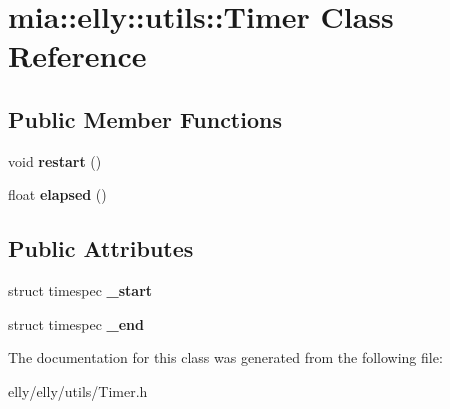 \hypertarget{classmia_1_1elly_1_1utils_1_1_timer}{\section{mia\-:\-:elly\-:\-:utils\-:\-:Timer Class Reference}
\label{classmia_1_1elly_1_1utils_1_1_timer}
}
\subsection*{Public Member Functions}
\begin{DoxyCompactItemize}
\item 
\hypertarget{classmia_1_1elly_1_1utils_1_1_timer_ab1d1c1ad1f3a3931f9e83917494d4417}{void {\bfseries restart} ()}\label{classmia_1_1elly_1_1utils_1_1_timer_ab1d1c1ad1f3a3931f9e83917494d4417}

\item 
\hypertarget{classmia_1_1elly_1_1utils_1_1_timer_adbdb379b3e084eb86b88e5edaaefc27c}{float {\bfseries elapsed} ()}\label{classmia_1_1elly_1_1utils_1_1_timer_adbdb379b3e084eb86b88e5edaaefc27c}

\end{DoxyCompactItemize}
\subsection*{Public Attributes}
\begin{DoxyCompactItemize}
\item 
\hypertarget{classmia_1_1elly_1_1utils_1_1_timer_a2719cf47fab1edb158bf7a7424fed6af}{struct timespec {\bfseries \-\_\-start}}\label{classmia_1_1elly_1_1utils_1_1_timer_a2719cf47fab1edb158bf7a7424fed6af}

\item 
\hypertarget{classmia_1_1elly_1_1utils_1_1_timer_a04fc3f2bb34cc79d9761e23f4118d590}{struct timespec {\bfseries \-\_\-end}}\label{classmia_1_1elly_1_1utils_1_1_timer_a04fc3f2bb34cc79d9761e23f4118d590}

\end{DoxyCompactItemize}


The documentation for this class was generated from the following file\-:\begin{DoxyCompactItemize}
\item 
elly/elly/utils/Timer.\-h\end{DoxyCompactItemize}
